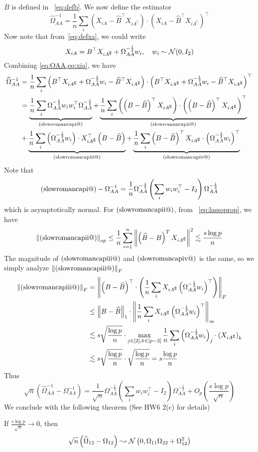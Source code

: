 \documentclass[12pt]{article}
\makeatletter
\newcommand{\calN}{{\cal N}}
\newcommand{\com}{^\complement}
\newcommand{\inv}{^{-1}}
\newcommand{\tp}{^\top}
\newcommand{\bra}[1]{\left(#1\right)}
\newcommand{\norm}[1]{\left\|#1\right\|}
\newcommand{\wh}[1]{\widehat{#1}}
\def\beq{\begin{equation}}
\def\eeq{\end{equation}}
\def\beqal{\begin{equation}\begin{aligned}}
\def\eeqal{\end{aligned}\end{equation}}
\newcommand{\ndone}{\frac{1}{n}}
\newcommand*{\rom}[1]{\expandafter\@slowromancap\romannumeral #1@}
\makeatother
\begin{document}
$B$ is defined in ~\ref{eq:defb}. We now define the estimator
\beq\label{eq:OAA}
\wh{\Omega}_{AA}\inv = \ndone \sum_i \bra{X_{iA}-\wh{B}\tp X_{iA\com}}\cdot\bra{X_{iA}-\wh{B}\tp X_{iA\com}}\tp
\eeq
Now note that from~\ref{eq:defxa}, we could write
\beq\label{eq:xia}
X_{iA}=B\tp X_{iA\com}+\Omega_{AA}^{-\frac{1}{2}}w_i, \quad w_i\sim \calN(0, I_2)
\eeq
Combining \cref{eq:OAA,eq:xia}, we have
\beqal
\wh{\Omega}_{AA}\inv& = \ndone \sum_i \bra{B\tp X_{iA\com}+\Omega_{AA}^{-\frac{1}{2}}w_i-\wh{B}\tp X_{iA\com}}\cdot\bra{B\tp X_{iA\com}+\Omega_{AA}^{-\frac{1}{2}}w_i-\wh{B}\tp X_{iA\com}}\tp\\
&=\underbrace{\ndone\sum_i \Omega_{AA}^{-\frac{1}{2}}w_iw_i\tp\Omega_{AA}^{-\frac{1}{2}}}_{(\text{\rom{1}})}+ \underbrace{\ndone\sum_i \bra{\bra{B-\wh{B}}\tp X_{iA\com}}\cdot \bra{\bra{B-\wh{B}}\tp X_{iA\com}}\tp}_{(\text{\rom{2}})}\\
&+\underbrace{\ndone\sum_i \bra{\Omega_{AA}^{-\frac{1}{2}}w_i}\cdot X_{iA\com}\tp \bra{B-\wh{B}} }_{(\text{\rom{3}})}+\underbrace{\ndone\sum_i \bra{B-\wh{B}}\tp X_{iA\com} \cdot  \bra{\Omega_{AA}^{-\frac{1}{2}}w_i}\tp }_{(\text{\rom{4}})}
\eeqal
Note that
\beq
(\text{\rom{1}})-\Omega_{AA}^{-1}=\ndone\Omega_{AA}^{-\frac{1}{2}}\bra{\sum_i w_iw_i\tp-I_2}\Omega_{AA}^{-\frac{1}{2}}
\eeq
which is asymptotically normal.
For $(\text{\rom{2}})$, from ~\ref{eq:lassoprop}, we have
\beq
\norm{(\text{\rom{2}})}_{op}\leq \frac{1}{n} \sum_{i=1}^{n}\left\|\left(\widehat{B}-B\right)^{T} X_{i A^{\complement}}\right\|^{2} \lesssim \frac{s \log p}{n}\\
\eeq
The magnitude of $(\text{\rom{3}})$ and $(\text{\rom{4}})$ is the same, so we simply analyze $\norm{(\text{\rom{3}})}_F$
\beqal
\norm{(\text{\rom{3}})}_F&= \norm{\bra{B-\wh{B}}^\top\cdot \bra{\ndone\sum_i X_{iA\com} \bra{\Omega_{AA}^{-\frac{1}{2}}w_i}\tp }}_F\\
&\leq \norm{B-\wh{B}}_1\cdot \norm{\ndone\sum_i X_{iA\com} \bra{\Omega_{AA}^{-\frac{1}{2}}w_i}\tp}_\infty\\
&\lesssim s\sqrt{\frac{\log p}{n}}\cdot \max_{j\in [2],k\in [p-2]}\ndone\sum_i \bra{\Omega_{AA}^{-\frac{1}{2}}w_i}_j\cdot \bra{X_{iA\com}}_k\\
&\lesssim s\sqrt{\frac{\log p}{n}}\cdot \sqrt{\frac{\log p}{n}}=s\frac{\log p}{n}
\eeqal
Thus
\beq
\sqrt{n} \bra{\wh{\Omega}_{AA}\inv -\Omega_{AA}\inv} = \frac{1}{\sqrt{n}}\Omega_{AA}^{-\frac{1}{2}}\bra{\sum_i w_iw_i\tp-I_2}\Omega_{AA}^{-\frac{1}{2}}+O_p\bra{\frac{s\log p}{\sqrt{n}}}
\eeq
We conclude with the following theorem (See HW6 2(c) for details)
\begin{theorem}
If $\frac{s\log p}{\sqrt{n}}\rightarrow 0$, then
\beq
\sqrt{n}\bra{\wh{\Omega}_{12}-\Omega_{12}}\leadsto \calN\bra{0, \Omega_{11}\Omega_{22}+\Omega_{12}^2}
\eeq
\end{theorem}
\end{document}
